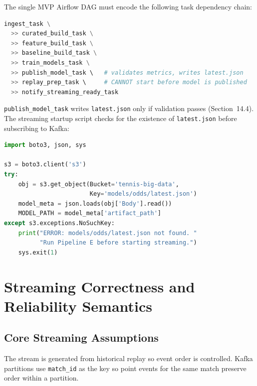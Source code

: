 \documentclass[11pt,a4paper]{article}
\begin{document}
\begin{criticalbox}
The single MVP Airflow DAG must encode the following task dependency chain:

\begin{lstlisting}[language=python, caption={nightly\_batch\_pipeline.py --- task ordering}]
ingest_task \
  >> curated_build_task \
  >> feature_build_task \
  >> baseline_build_task \
  >> train_models_task \
  >> publish_model_task \   # validates metrics, writes latest.json
  >> replay_prep_task \     # CANNOT start before model is published
  >> notify_streaming_ready_task
\end{lstlisting}

\texttt{publish\_model\_task} writes \texttt{latest.json} only if validation passes (Section~14.4).
The streaming startup script checks for the existence of \texttt{latest.json} before subscribing
to Kafka:

\begin{lstlisting}[language=python, caption={streaming\_processor.py --- model readiness check}]
import boto3, json, sys

s3 = boto3.client('s3')
try:
    obj = s3.get_object(Bucket='tennis-big-data',
                        Key='models/odds/latest.json')
    model_meta = json.loads(obj['Body'].read())
    MODEL_PATH = model_meta['artifact_path']
except s3.exceptions.NoSuchKey:
    print("ERROR: models/odds/latest.json not found. "
          "Run Pipeline E before starting streaming.")
    sys.exit(1)
\end{lstlisting}
\end{criticalbox}

\section{Streaming Correctness and Reliability Semantics}

\subsection{Core Streaming Assumptions}

The stream is generated from historical replay so event order is controlled. Kafka partitions use
\texttt{match\_id} as the key so point events for the same match preserve order within a
partition.
\end{document}

